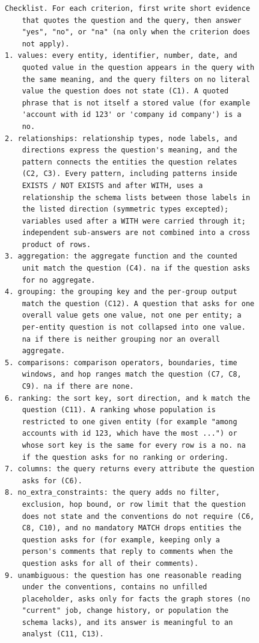 \begin{verbatim}
Checklist. For each criterion, first write short evidence
    that quotes the question and the query, then answer
    "yes", "no", or "na" (na only when the criterion does
    not apply).
1. values: every entity, identifier, number, date, and
    quoted value in the question appears in the query with
    the same meaning, and the query filters on no literal
    value the question does not state (C1). A quoted
    phrase that is not itself a stored value (for example
    'account with id 123' or 'company id company') is a
    no.
2. relationships: relationship types, node labels, and
    directions express the question's meaning, and the
    pattern connects the entities the question relates
    (C2, C3). Every pattern, including patterns inside
    EXISTS / NOT EXISTS and after WITH, uses a
    relationship the schema lists between those labels in
    the listed direction (symmetric types excepted);
    variables used after a WITH were carried through it;
    independent sub-answers are not combined into a cross
    product of rows.
3. aggregation: the aggregate function and the counted
    unit match the question (C4). na if the question asks
    for no aggregate.
4. grouping: the grouping key and the per-group output
    match the question (C12). A question that asks for one
    overall value gets one value, not one per entity; a
    per-entity question is not collapsed into one value.
    na if there is neither grouping nor an overall
    aggregate.
5. comparisons: comparison operators, boundaries, time
    windows, and hop ranges match the question (C7, C8,
    C9). na if there are none.
6. ranking: the sort key, sort direction, and k match the
    question (C11). A ranking whose population is
    restricted to one given entity (for example "among
    accounts with id 123, which have the most ...") or
    whose sort key is the same for every row is a no. na
    if the question asks for no ranking or ordering.
7. columns: the query returns every attribute the question
    asks for (C6).
8. no_extra_constraints: the query adds no filter,
    exclusion, hop bound, or row limit that the question
    does not state and the conventions do not require (C6,
    C8, C10), and no mandatory MATCH drops entities the
    question asks for (for example, keeping only a
    person's comments that reply to comments when the
    question asks for all of their comments).
9. unambiguous: the question has one reasonable reading
    under the conventions, contains no unfilled
    placeholder, asks only for facts the graph stores (no
    "current" job, change history, or population the
    schema lacks), and its answer is meaningful to an
    analyst (C11, C13).


\end{verbatim}
